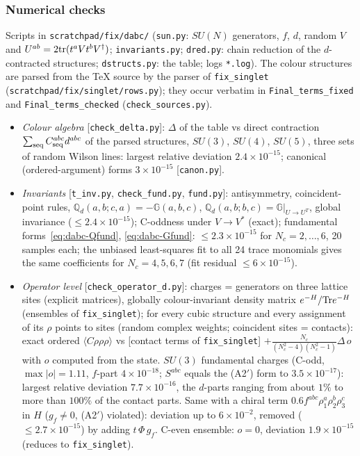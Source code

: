 \documentclass[10pt]{article}
\def\mf#1{\mathbb{#1}}
\begin{document}
\subsubsection{Numerical checks}\label{sec:dabc-num}
\noindent Scripts in \texttt{scratchpad/fix/dabc/} (\texttt{sun.py}: $SU(N)$ generators, $f$, $d$, random $V$ and $U^{ab}=2{\rm tr}(t^{a}Vt^{b}V^{\dagger})$; \texttt{invariants.py}; \texttt{dred.py}: chain reduction of the $d$-contracted structures; \texttt{dstructs.py}: the table; logs \texttt{*.log}). The colour structures are parsed from the TeX source by the parser of \texttt{fix\_singlet} (\texttt{scratchpad/fix/singlet/rows.py}); they occur verbatim in \texttt{Final\_terms\_fixed} and \texttt{Final\_terms\_checked} (\texttt{check\_sources.py}).
\begin{itemize}
\item \emph{Colour algebra} [\texttt{check\_delta.py}]: $\Delta$ of the table vs direct contraction $\sum_{\rm seq}C^{abc}_{\rm seq}d^{abc}$ of the parsed structures, $SU(3)$, $SU(4)$, $SU(5)$, three sets of random Wilson lines: largest relative deviation $2.4\times10^{-15}$; canonical (ordered-argument) forms $3\times10^{-15}$ [\texttt{canon.py}].
\item \emph{Invariants} [\texttt{t\_inv.py}, \texttt{check\_fund.py}, \texttt{fund.py}]: antisymmetry, coincident-point rules, $\mf{Q}_{d}(a,b;c,a)=-\mf{G}(a,b,c)$, $\mf{Q}_{d}(a,b;b,c)=\mf{G}|_{U\to U^{T}}$, global invariance ($\le2.4\times10^{-15}$); C-oddness under $V\to V^{*}$ (exact); fundamental forms~\eqref{eq:dabc-Qfund}, \eqref{eq:dabc-Gfund}: $\le2.3\times10^{-15}$ for $N_{c}=2,\dots,6$, 20 samples each; the unbiased least-squares fit to all 24 trace monomials gives the same coefficients for $N_{c}=4,5,6,7$ (fit residual $\le6\times10^{-15}$).
\item \emph{Operator level} [\texttt{check\_operator\_d.py}]: charges = generators on three lattice sites (explicit matrices), globally colour-invariant density matrix $e^{-H}/{\rm Tr}e^{-H}$ (ensembles of \texttt{fix\_singlet}); for every cubic structure and every assignment of its $\rho$ points to sites (random complex weights; coincident sites = contacts): exact ordered $\langle C\rho\rho\rho\rangle$ vs [contact terms of \texttt{fix\_singlet}] $+\frac{N_{c}}{(N_{c}^{2}-4)(N_{c}^{2}-1)}\Delta\,o$ with $o$ computed from the state. $SU(3)$ fundamental charges (C-odd, $\max|o|=1.11$, $f$-part $4\times10^{-18}$; $S^{abc}$ equals the (A2$'$) form to $3.5\times10^{-17}$): largest relative deviation $7.7\times10^{-16}$, the $d$-parts ranging from about $1\%$ to more than $100\%$ of the contact parts. Same with a chiral term $0.6f^{abc}\rho_{1}^{a}\rho_{2}^{b}\rho_{3}^{c}$ in $H$ ($g_{f}\neq0$, (A2$'$) violated): deviation up to $6\times10^{-2}$, removed ($\le2.7\times10^{-15}$) by adding $t\,\Phi\,g_{f}$. C-even ensemble: $o=0$, deviation $1.9\times10^{-15}$ (reduces to \texttt{fix\_singlet}).

\end{itemize}
\end{document}
